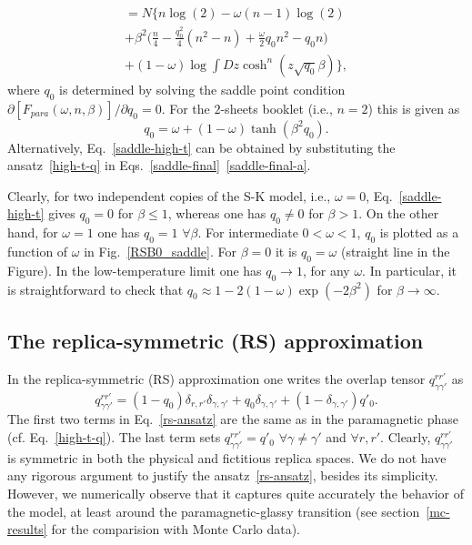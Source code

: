 \documentclass[twocolumn,superscriptaddress,prb,10pt]{revtex4-1}
\begin{document}
%
\begin{multline}
[F_{para}(\omega,n,\beta)]=N\Big\{
n\log(2)-\omega(n-1)\log(2)\\+
\beta^2\Big(\frac{n}{4}-\frac{q_0^2}{4}(n^2-n)
+\frac{\omega}{2}q_0n^2-q_0n\Big)\\
+(1-\omega)\log\int Dz\cosh^n(z\sqrt{q_0}\beta)
\Big\},
\label{ht-logZ}
\end{multline}
%
where $q_0$ is determined by solving the saddle point condition $\partial[F_{para}
(\omega,n,\beta)]/\partial q_0=0$. For the $2$-sheets booklet (i.e., $n=2$) this is  
given as   
%
\begin{equation}
q_0=\omega+(1-\omega)\tanh(\beta^2 q_0).
\label{saddle-high-t}
\end{equation}
%
Alternatively, Eq.~\eqref{saddle-high-t} can be obtained by substituting the 
ansatz~\eqref{high-t-q} in Eqs.~\eqref{saddle-final}~\eqref{saddle-final-a}. 

Clearly, for two independent copies of the S-K model, i.e., $\omega=0$,  
Eq.~\eqref{saddle-high-t} gives $q_0=0$ for $\beta\le1$, whereas 
one has $q_0\ne0$ for $\beta>1$. On the other hand, for $\omega=1$ 
one has $q_0=1$ $\forall\beta$. For intermediate $0<\omega<1$, $q_0$ 
is plotted as a function of $\omega$ in Fig.~\ref{RSB0_saddle}. For $\beta=0$ it 
is $q_0=\omega$ (straight line in the Figure). In the low-temperature limit 
one has $q_0\to 1$, for any $\omega$. In particular, it is straightforward 
to check that  $q_0\approx 1-2(1-\omega)\exp(-2\beta^2)$ for $\beta\to\infty$. 


\subsection{The replica-symmetric (RS) approximation} 
\label{rs-section}

In the replica-symmetric (RS) approximation one writes the overlap tensor  
$q_{\gamma\gamma'}^{rr'}$ as
%
\begin{equation}
q_{\gamma\gamma'}^{rr'}=(1-q_0)\delta_{r,r'}\delta_{\gamma,\gamma'}+
q_0\delta_{\gamma,\gamma'}+(1-\delta_{\gamma,\gamma'})q'_0.
\label{rs-ansatz}
\end{equation}
%
The first two terms in Eq.~\eqref{rs-ansatz} are the same as in the paramagnetic 
phase (cf. Eq.~\eqref{high-t-q}). The last term sets $q_{\gamma\gamma'}^{rr'}=q'_0$ 
$\forall\gamma\ne\gamma'$ and $\forall r,r'$. Clearly, $q_{\gamma\gamma'}^{rr'}$ is 
symmetric in both the physical and fictitious replica spaces. We do not have any 
rigorous argument to justify the ansatz~\eqref{rs-ansatz}, besides its simplicity. 
However, we numerically observe that it captures quite accurately the behavior of 
the model, at least around the paramagnetic-glassy transition (see section~\ref{mc-results} 
for the comparision with Monte Carlo data). 
\end{document}
